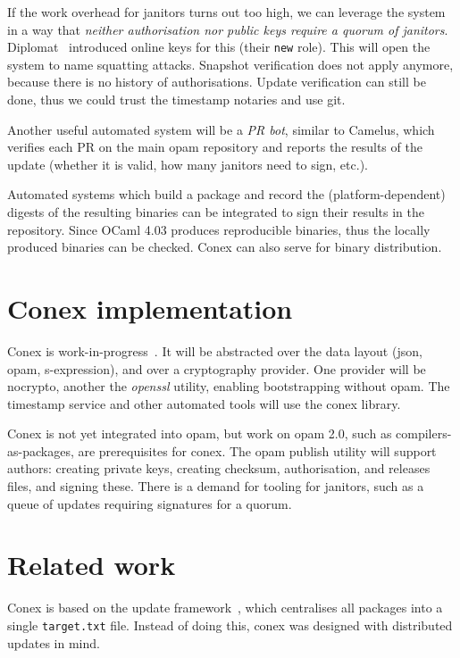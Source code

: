 \documentclass[nocopyrightspace]{sigplanconf}
\newcommand{\TODO}[1]{\textbf{[TODO: #1]}}
\begin{document}
If the work overhead for janitors turns out too high, we can leverage the system in a way that \emph{neither authorisation nor public keys require a quorum of janitors}.
Diplomat~\cite{diplomat} introduced online keys for this (their \texttt{new} role).
This will open the system to name squatting attacks.
Snapshot verification does not apply anymore, because there is no history of authorisations.
Update verification can still be done, thus we could trust the timestamp notaries and use git.


Another useful automated system will be a \emph{PR bot}, similar to Camelus, which verifies each PR on the main opam repository and reports the results of the update (whether it is valid, how many janitors need to sign, etc.).

Automated systems which build a package and record the (platform-dependent) digests of the resulting binaries can be integrated to sign their results in the repository.
Since OCaml 4.03 produces reproducible binaries, thus the locally produced binaries can be checked.
Conex can also serve for binary distribution.

\section{Conex implementation} \label{sec:implementation}

Conex is work-in-progress~\cite{conex}.
It will be abstracted over the data layout (json, opam, s-expression), and over a cryptography provider.
One provider will be nocrypto, another the \emph{openssl} utility, enabling bootstrapping without opam.
The timestamp service and other automated tools will use the conex library.

Conex is not yet integrated into opam, but work on opam 2.0, such as compilers-as-packages, are prerequisites for conex.
The opam publish utility will support authors: creating private keys, creating checksum, authorisation, and releases files, and signing these.
There is a demand for tooling for janitors, such as a queue of updates requiring signatures for a quorum.

\section{Related work} \label{sec:related}
Conex is based on the update framework~\cite{tuf}, which centralises all packages into a single \texttt{target.txt} file.
Instead of doing this, conex was designed with distributed updates in mind.
\end{document}
